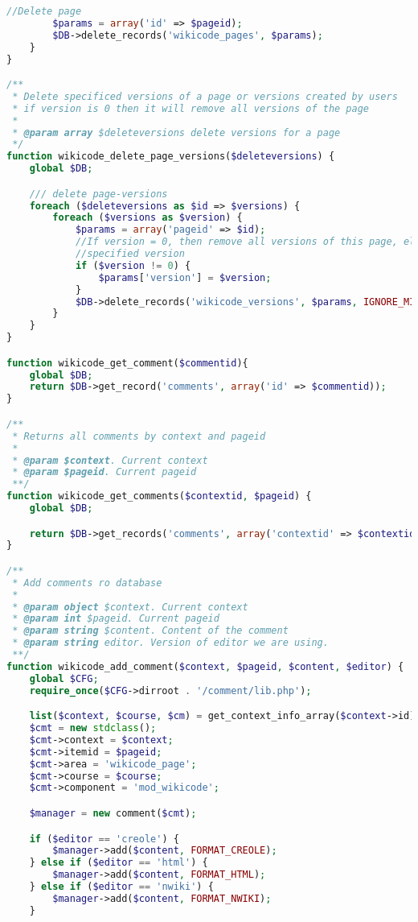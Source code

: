 \begin{lstlisting}[language=PHP]
        //Delete page
        $params = array('id' => $pageid);
        $DB->delete_records('wikicode_pages', $params);
    }
}

/**
 * Delete specificed versions of a page or versions created by users
 * if version is 0 then it will remove all versions of the page
 *
 * @param array $deleteversions delete versions for a page
 */
function wikicode_delete_page_versions($deleteversions) {
    global $DB;

    /// delete page-versions
    foreach ($deleteversions as $id => $versions) {
        foreach ($versions as $version) {
            $params = array('pageid' => $id);
            //If version = 0, then remove all versions of this page, else remove
            //specified version
            if ($version != 0) {
                $params['version'] = $version;
            }
            $DB->delete_records('wikicode_versions', $params, IGNORE_MISSING);
        }
    }
}

function wikicode_get_comment($commentid){
    global $DB;
    return $DB->get_record('comments', array('id' => $commentid));
}

/**
 * Returns all comments by context and pageid
 *
 * @param $context. Current context
 * @param $pageid. Current pageid
 **/
function wikicode_get_comments($contextid, $pageid) {
    global $DB;

    return $DB->get_records('comments', array('contextid' => $contextid, 'itemid' => $pageid, 'commentarea' => 'wikicode_page'));
}

/**
 * Add comments ro database
 *
 * @param object $context. Current context
 * @param int $pageid. Current pageid
 * @param string $content. Content of the comment
 * @param string editor. Version of editor we are using.
 **/
function wikicode_add_comment($context, $pageid, $content, $editor) {
    global $CFG;
    require_once($CFG->dirroot . '/comment/lib.php');

    list($context, $course, $cm) = get_context_info_array($context->id);
    $cmt = new stdclass();
    $cmt->context = $context;
    $cmt->itemid = $pageid;
    $cmt->area = 'wikicode_page';
    $cmt->course = $course;
    $cmt->component = 'mod_wikicode';

    $manager = new comment($cmt);

    if ($editor == 'creole') {
        $manager->add($content, FORMAT_CREOLE);
    } else if ($editor == 'html') {
        $manager->add($content, FORMAT_HTML);
    } else if ($editor == 'nwiki') {
        $manager->add($content, FORMAT_NWIKI);
    }


\end{lstlisting}
